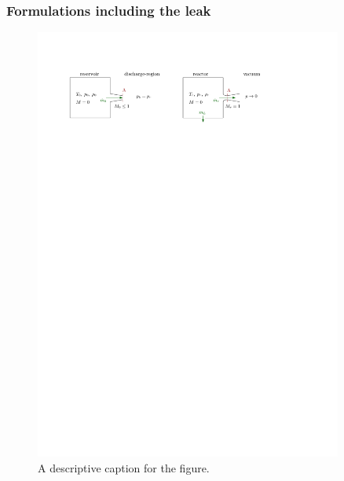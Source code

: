 \subsubsection*{Formulations including the leak}

\begin{figure}[H]
    \centering
    \includegraphics[width=0.9\textwidth]{src/03_analytical-work/fig_disconnected-reservoirs-with-leak.pdf}
    \caption{A descriptive caption for the figure.}
    \label{fig:disconnected-reservoirs-leak}
\end{figure}

